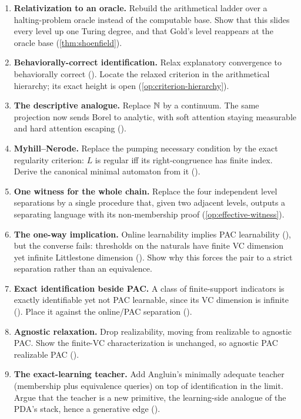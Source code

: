 \begin{enumerate}[leftmargin=*,itemsep=3pt]
\item \textbf{Relativization to an oracle.} Rebuild the arithmetical ladder over a halting-problem oracle instead of the computable base. Show that this slides every level up one Turing degree, and that Gold's level reappears at the oracle base (\cref{thm:shoenfield}).
\item \textbf{Behaviorally-correct identification.} Relax explanatory convergence to behaviorally correct (). Locate the relaxed criterion in the arithmetical hierarchy; its exact height is open (\cref{op:criterion-hierarchy}).
\item \textbf{The descriptive analogue.} Replace $\mathbb{N}$ by a continuum. The same projection now sends Borel to analytic, with soft attention staying measurable and hard attention escaping ().
\item \textbf{Myhill--Nerode.} Replace the pumping necessary condition by the exact regularity criterion: $L$ is regular iff its right-congruence has finite index. Derive the canonical minimal automaton from it ().
\item \textbf{One witness for the whole chain.} Replace the four independent level separations by a single procedure that, given two adjacent levels, outputs a separating language with its non-membership proof (\cref{op:effective-witness}).
\item \textbf{The one-way implication.} Online learnability implies PAC learnability (), but the converse fails: thresholds on the naturals have finite VC dimension yet infinite Littlestone dimension (). Show why this forces the pair to a strict separation rather than an equivalence.
\item \textbf{Exact identification beside PAC.} A class of finite-support indicators is exactly identifiable yet not PAC learnable, since its VC dimension is infinite (). Place it against the online/PAC separation ().
\item \textbf{Agnostic relaxation.} Drop realizability, moving from realizable to agnostic PAC. Show the finite-VC characterization is unchanged, so agnostic PAC  realizable PAC (\cite{ShalevShwartzBenDavid2014}).
\item \textbf{The exact-learning teacher.} Add Angluin's minimally adequate teacher (membership plus equivalence queries) on top of identification in the limit. Argue that the teacher is a new primitive, the learning-side analogue of the PDA's stack, hence a generative edge (\cite{Angluin1987}).
\end{enumerate}
